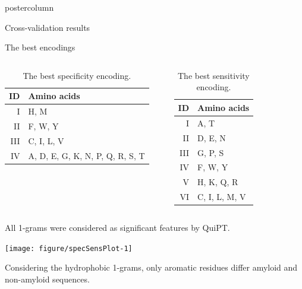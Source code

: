 \documentclass[final]{beamer}\usepackage[]{graphicx}\usepackage[]{color}
\newenvironment{knitrout}{}{} %
\begin{document}
\begin{frame}
\begin{columns}
\begin{column}{.51\textwidth}
\begin{beamercolorbox}[center,wd=\textwidth]{postercolumn}
\begin{minipage}[T]{.95\textwidth}
{\begin{block}{Cross-validation results}
\end{block}
\vfill


\begin{block}{The best encodings}
\begin{columns}

\begin{table}[ht]
\centering
\caption{The best specificity encoding.} 
\begin{tabular}{r | l}
\toprule
ID & Amino acids \\ 
\midrule
I & H, M \\ 
\rowcolor[gray]{0.75}II & F, W, Y \\ 
III &  C, I, L, V \\ 
\rowcolor[gray]{0.75}IV &  A, D, E, G, K, N, P, Q, R, S, T \\ 
\bottomrule
\end{tabular}
\label{tab:best}
\end{table}


\begin{table}[ht]
\centering
\caption{The best sensitivity encoding.} 
\begin{tabular}{r | l}
\toprule
ID & Amino acids \\ 
\midrule
I & A, T \\ 
\rowcolor[gray]{0.75}II & D, E, N \\ 
III & G, P, S \\ 
\rowcolor[gray]{0.75}IV &  F, W, Y \\ 
V & H, K, Q, R \\ 
\rowcolor[gray]{0.75}VI &  C, I, L, M, V \\ 
\bottomrule
\end{tabular}
\label{tab:best}
\end{table}

\end{columns}

All 1-grams were considered as significant features by QuiPT.

\begin{knitrout}
\color{fgcolor}
\texttt{[image: figure/specSensPlot-1]} 

\end{knitrout}

Considering the hydrophobic 1-grams, only aromatic residues differ amyloid and non-amyloid sequences.

\end{block}
\vfill

}
\end{minipage}
\end{beamercolorbox}
\end{column}
\end{columns}
\end{frame}
\end{document}
